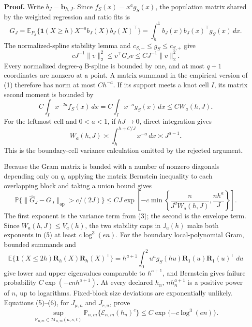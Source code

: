 \textbf{Proof.}
Write \(b_J=\mathbf b_{h,J}\).  Since \(f_S(x)=x^ag_S(x)\), the population matrix shared by the weighted regression and ratio fits is
\[
 G_J=\mathbb E_{P_S}\{\mathbf 1(X\ge h)X^{-a}b_J(X)b_J(X)^\top\}
 =\int_h^1b_J(x)b_J(x)^\top g_S(x)\,dx.
\tag{1}
\]
The normalized-spline stability lemma and \(c_{S,-}\le g_S\le c_{S,+}\) give
\[
 cJ^{-1}\|v\|_2^2\le v^\top G_Jv\le CJ^{-1}\|v\|_2^2.
\tag{2}
\]
Every normalized degree-\(q\) B-spline is bounded by one, and at most \(q+1\) coordinates are nonzero at a point.  A matrix summand in the empirical version of (1) therefore has norm at most \(Ch^{-a}\).  If its support meets a knot cell \(I\), its matrix second moment is bounded by
\[
 C\int_Ix^{-2a}f_S(x)\,dx
 =C\int_Ix^{-a}g_S(x)\,dx
 \le C W_a(h,J).
\tag{3}
\]
For the leftmost cell and \(0<a<1\), if \(hJ\to0\), direct integration gives
\[
 W_a(h,J)\asymp\int_h^{h+C/J}x^{-a}\,dx\asymp J^{a-1}.
\tag{4}
\]
This is the boundary-cell variance calculation omitted by the rejected argument.

Because the Gram matrix is banded with a number of nonzero diagonals depending only on \(q\), applying the matrix Bernstein inequality to each overlapping block and taking a union bound gives
\[
 \mathbb P\{\|\widehat G_J-G_J\|_{\mathrm{op}}>c/(2J)\}
 \le CJ\exp\!\left[-c\min\left\{
 \frac{n}{J^2W_a(h,J)},\frac{nh^a}{J}
 \right\}\right].
\tag{5}
\]
The first exponent is the variance term from (3); the second is the envelope term.  Since \(W_a(h,J)\le V_a(h)\), the two stability caps in \(\mathsf J_u(h)\) make both exponents in (5) at least \(c\log^3(en)\).  For the boundary local-polynomial Gram, bounded summands and
\[
 \mathbb E\{\mathbf 1(X\le2h)\mathbf R_h(X)\mathbf R_h(X)^\top\}
 =h^{a+1}\int_0^2u^ag_S(hu)\mathbf R_1(u)\mathbf R_1(u)^\top\,du
\tag{6}
\]
give lower and upper eigenvalues comparable to \(h^{a+1}\), and Bernstein gives failure probability \(C\exp(-cnh^{a+1})\).  At every declared \(h_n\), \(nh_n^{a+1}\) is a positive power of \(n\), up to logarithms.  Fixed-block size deviations are exponentially unlikely.  Equations (5)--(6), for \(J_{\mu,n}\) and \(J_{r,n}\), prove
\[
 \sup_{\mathbb P_{n,m}\in\mathcal M_{n,m}(a,s,t)}
 \mathbb P_{n,m}\{\mathcal E_{n,m}(h_n)^c\}
 \le C\exp\{-c\log^3(en)\}.
\tag{7}
\]

